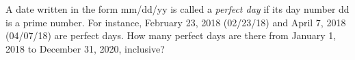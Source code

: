 A date written in the form mm/dd/yy is called a \emph{perfect day} if its day number dd is a prime number. For instance, February 23, 2018 (02/23/18) and April 7, 2018 (04/07/18) are perfect days. How many perfect days are there from January 1, 2018 to December 31, 2020, inclusive?
